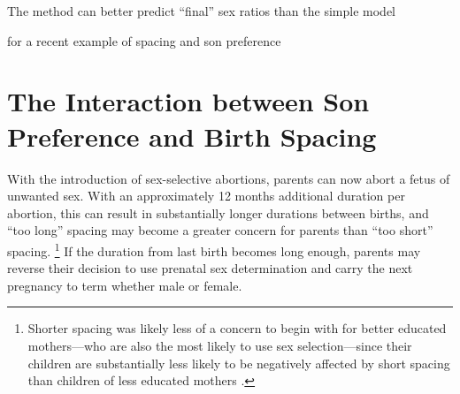 \documentclass[12pt,letterpaper]{article}
\begin{document}
The method can better predict ``final'' sex ratios than the simple model


\citep{Soest2012} for a recent example of spacing and son preference




\section{The Interaction between Son Preference and Birth Spacing\label{sec:model}}


With the introduction of sex-selective abortions, parents can now abort
a fetus of unwanted sex.
With an approximately 12 months additional duration per abortion,
this can result in substantially longer durations between births, and
``too long'' spacing may become a greater concern for parents than 
``too short'' spacing.%
\footnote{
Shorter spacing was likely less of a concern to begin with for
better educated mothers---who are also the most likely to use 
sex selection---since their children are substantially less likely 
to be negatively affected by short spacing than children of less 
educated mothers \citep{Whitworth2002}.
}
If the duration from last birth becomes long enough, parents may 
reverse their decision to use prenatal sex determination
and carry the next pregnancy to term whether male or female.
\end{document}

